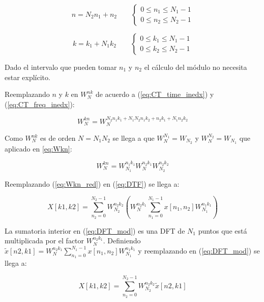 \begin{equation}
n = N_2n_1 + n_2 \qquad 
	\begin{cases}
	0\leq n_1 \leq N_1 -1 \\
	0\leq n_2 \leq N_2 -1
	\end{cases}
\label{eq:CT_time_inedx}
\end{equation}

\begin{equation}
k = k_1 + N_1k_2 \qquad 
	\begin{cases}
	0\leq k_1 \leq N_1 -1 \\
	0\leq k_2 \leq N_2 -1
	\end{cases}
\label{eq:CT_freq_inedx}
\end{equation}

Dado el intervalo que pueden tomar $n_1$ y $n_2$ el cálculo del módulo no
necesita estar explícito.

Reemplazando $n$ y $k$ en $W_N^{nk}$ de acuerdo a (\ref{eq:CT_time_inedx}) y
(\ref{eq:CT_freq_inedx}):

\begin{equation}
W_N^{kn}=W_N^{N_2n_1k_1+N_1N_2n_1k_2+n_2k_1+N_1n_2k_2} 
\label{eq:Wkn}
\end{equation}

Como $W_N^{nk}$ es de orden $N=N_1N_2$ se llega a que $W_N^{N_1}=W_{N_2}$ y
$W_N^{N_2}=W_{N_1}$ que aplicado en \ref{eq:Wkn}:

\begin{equation}
W_N^{kn}=W_{N_1}^{n_1k_1}W_N^{n_2k_1}W_{N_2}^{n_2k_2} 
\label{eq:Wkn_red}
\end{equation}

Reemplazando (\ref{eq:Wkn_red}) en (\ref{eq:DTF}) se llega a:

\begin{equation}
X[k1,k2]=\sum_{n_2=0}^{N_2-1}
W_{N_2}^{n_2k_2}\left(W_{N}^{n_2k_1}\sum_{n_1=0}^{N_1-1}x[n_1,n_2]W_{N_1}^{n_1k_1}\right)
\label{eq:DFT_mod}
\end{equation}

La sumatoria interior en (\ref{eq:DFT_mod}) es una DFT de $N_1$ puntos que está
multiplicada por el factor $W_{N}^{n_2k_1}$. Definiendo
$\tilde{x}[n2,k1]=W_{N}^{n_2k_1}\sum_{n_1=0}^{N_1-1}x[n_1,n_2]W_{N_1}^{n_1k_1}$
y reemplazando en (\ref{eq:DFT_mod}) se llega a:

\begin{equation}
X[k1,k2]=\sum_{n_2=0}^{N_2-1}
W_{N_2}^{n_2k_2}\tilde{x}[n2,k1]
\label{eq:DFT_tilde}
\end{equation}

